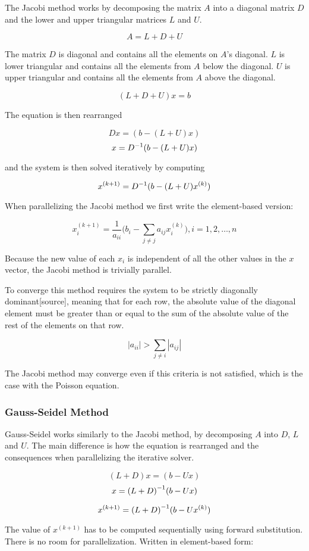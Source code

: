 The Jacobi method works by decomposing the matrix $A$ into a diagonal matrix $D$ 
and the lower and upper triangular matrices $L$ and $U$. 

$$A = L+D+U$$

The matrix $D$ is diagonal and contains all the elements on $A$'s diagonal. $L$ 
is lower triangular and contains all the elements from $A$ below the diagonal. 
$U$ is upper triangular and contains all the elements from $A$ above the diagonal.

$$(L+D+U)x = b$$

The equation is then rearranged 

$$Dx = (b - (L+U)x)$$
$$x = {D}^{-1}(b - (L+U)x)$$

and the system is then solved iteratively by computing 

$$x^{(k+1)} = {D}^{-1}(b - (L+U)x^{(k)})$$

When parallelizing the Jacobi method we first write the element-based version:

$$ x_i^{(k+1)} = \frac{1}{a_{ii}} \Big( b_i - \sum_{j \neq j} a_{ij} x_i^{(k)} \Big), i = 1, 2, \ldots, n $$

Because the new value of each $x_i$ is independent of all the other values in the 
$x$ vector, the Jacobi method is trivially parallel.

To converge this method requires the system to be strictly diagonally dominant[source],
meaning that for each row, the absolute value of the diagonal element must be
greater than or equal to the sum of the absolute value of the rest of the
elements on that row.

$$|a_{ii}| > \sum_{j \neq i} |a_{ij}|$$

The Jacobi method may converge even if this criteria is not satisfied, which is the case with the Poisson equation.

\subsubsection*{Gauss-Seidel Method}

Gauss-Seidel works similarly to the Jacobi method, by decomposing $A$ into $D$, 
$L$ and $U$. The main difference is how the equation is rearranged and the consequences 
when parallelizing the iterative solver. 

$$(L+D)x = (b - Ux)$$
$$x = {(L+D)}^{-1}(b - Ux)$$

$$x^{(k+1)} = {(L+D)}^{-1}(b - Ux^{(k)})$$

The value of $x^{(k+1)}$ has to be computed sequentially using forward substitution. 
There is no room for parallelization. Written in element-based form:

